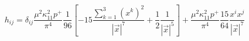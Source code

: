 \begin{equation}
h_{ij}=\delta_{ij}\frac{\mu^2\kappa_{11}^2p^+}{\pi^4} \frac{1}{96}
\left[ -15 \frac{\sum_{k=1}^3(x^k)^2}{|\vec{x}|^7}
+\frac{1}{2}\frac{1}{|\vec{x}|^5} \right]
+\frac{\mu^2\kappa_{11}^2p^+}{\pi^4}\frac{15}{64}\frac{x^ix^j}{|\vec{x}|^7}\label{hij}
\end{equation} 
